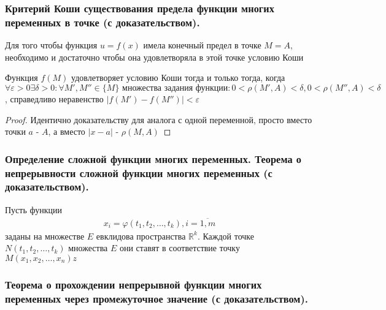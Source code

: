 \documentclass[10pt]{article}
\begin{document}
    \subsubsection{Критерий Коши существования предела функции многих переменных в точке (с доказательством).}
    \begin{theorem}
        Для того чтобы функция $u = f(x)$  имела конечный предел в точке $M = A$, необходимо и достаточно чтобы она удовлетворяла в этой точке условию Коши
        \begin{remark}
            Функция $f(M)$ удовлетворяет условию Коши тогда и только тогда, когда $\forall \varepsilon>0 \exists \delta > 0: \forall M', M'' \in \{M\}\text{ множества задания функции}: 0 < \rho(M', A) < \delta, 0 < \rho(M'', A) < \delta$, справедливо неравенство $|f(M') - f(M'')| < \varepsilon$
        \end{remark}
    \end{theorem}
    \begin{proof}
        Идентично доказательству для аналога с одной переменной, просто вместо точки $a$ - $A$, а вместо $|x - a|$ - $\rho(M, A)$
    \end{proof}



    \subsubsection{Определение сложной функции многих переменных. Теорема о непрерывности сложной функции многих переменных (с доказательством).}
    \begin{definition}
        Пусть функции 
        \begin{gather*}
            x_i = \varphi(t_1, t_2, \ldots, t_k), i = \overline{1, m}
        \end{gather*}
        заданы на множестве $E$ евклидова пространства $\mathbb{R}^k$. Каждой точке $N(t_1, t_2, \ldots, t_k)$ множества $E$ они ставят в соответствие точку $M(x_1, x_2, \ldots, x_n)z$
    \end{definition}



    \subsubsection{Теорема о прохождении непрерывной функции многих переменных через промежуточное значение (с доказательством).}
\end{document}
